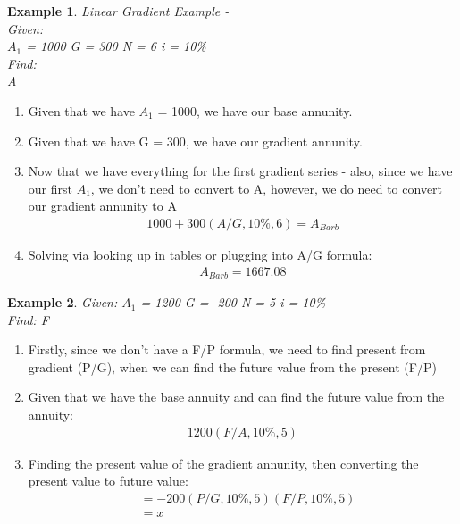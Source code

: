\documentclass{report} %
\newtheorem{exmp}{Example}
\begin{document}
\newpage
\begin{exmp}
    Linear Gradient Example - \\
    Given: \\
    $A_1$ = 1000 \quad G = 300 \quad N = 6 \quad i = 10\% \\
    Find: \\
    A
\end{exmp}
\begin{enumerate}
    \item Given that we have $A_1$ = 1000, we have our base annunity.
    \item Given that we have G = 300, we have our gradient annunity.
    \item Now that we have everything for the first gradient series - also, since we have our first $A_1$, we don't need to convert to A, however, we do need to convert our gradient annunity to A 
    \begin{equation*}
        \begin{aligned}
            1000 + 300(A/G,10\%,6) = A_{Barb}        
        \end{aligned}
    \end{equation*}
    \item Solving via looking up in tables or plugging into A/G formula:
    \begin{equation*}
        \begin{aligned}
            A_{Barb} = 1667.08
        \end{aligned}
    \end{equation*}
\end{enumerate}

\begin{exmp}
    Given: \quad $A_1$ = 1200 \quad G = -200 \quad N = 5 \quad i = 10\% \\
    Find: \quad F
\end{exmp}
\begin{enumerate}
    \item Firstly, since we don't have a F/P formula, we need to find present from gradient (P/G), when we can find the future value from the present (F/P)
    \item Given that we have the base annuity and can find the future value from the annuity:
    \begin{equation*}
        \begin{aligned}
            1200(F/A,10\%,5)
        \end{aligned}
    \end{equation*}
    \item Finding the present value of the gradient annunity, then converting the present value to future value:
    \begin{equation*}
        \begin{aligned}
           &= -200(P/G,10\%,5)(F/P,10\%,5)\\
           &= x %
        \end{aligned}
    \end{equation*}
\end{enumerate}
\end{document}
